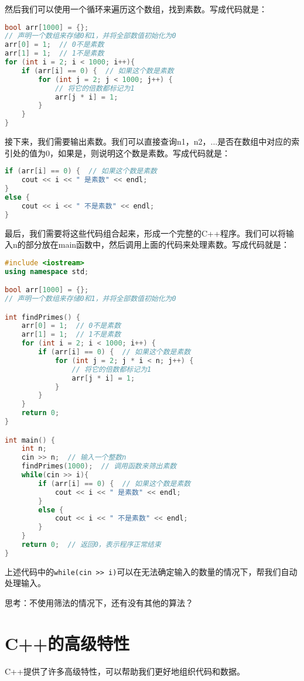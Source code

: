 \documentclass[../main.tex]{subfiles}
\begin{document}
然后我们可以使用一个循环来遍历这个数组，找到素数。写成代码就是：
\begin{lstlisting}[language=C++]
bool arr[1000] = {};
// 声明一个数组来存储0和1，并将全部数值初始化为0
arr[0] = 1;  // 0不是素数
arr[1] = 1;  // 1不是素数
for (int i = 2; i < 1000; i++){
    if (arr[i] == 0) {  // 如果这个数是素数
        for (int j = 2; j < 1000; j++) {
            // 将它的倍数都标记为1
            arr[j * i] = 1;
        }
    }
}
\end{lstlisting}

接下来，我们需要输出素数。我们可以直接查询n1，n2，...是否在数组中对应的索引处的值为0，如果是，则说明这个数是素数。写成代码就是：
\begin{lstlisting}[language=C++]
if (arr[i] == 0) {  // 如果这个数是素数
    cout << i << " 是素数" << endl;
}
else {
    cout << i << " 不是素数" << endl;
}
\end{lstlisting}
最后，我们需要将这些代码组合起来，形成一个完整的C++程序。我们可以将输入n的部分放在main函数中，然后调用上面的代码来处理素数。写成代码就是：
\begin{lstlisting}[language=C++]
#include <iostream>
using namespace std;

bool arr[1000] = {};
// 声明一个数组来存储0和1，并将全部数值初始化为0

int findPrimes() {
    arr[0] = 1;  // 0不是素数
    arr[1] = 1;  // 1不是素数
    for (int i = 2; i < 1000; i++) {
        if (arr[i] == 0) {  // 如果这个数是素数
            for (int j = 2; j * i < n; j++) {
                // 将它的倍数都标记为1
                arr[j * i] = 1;
            }
        }
    }
    return 0;
}

int main() {
    int n;
    cin >> n;  // 输入一个整数n
    findPrimes(1000);  // 调用函数来筛出素数
    while(cin >> i){
        if (arr[i] == 0) {  // 如果这个数是素数
            cout << i << " 是素数" << endl;
        }
        else {
            cout << i << " 不是素数" << endl;
        }
    }
    return 0;  // 返回0，表示程序正常结束
}
\end{lstlisting}
上述代码中的\texttt{while(cin >> i)}可以在无法确定输入的数量的情况下，帮我们自动处理输入。

思考：不使用筛法的情况下，还有没有其他的算法？

\section{C++的高级特性}
C++提供了许多高级特性，可以帮助我们更好地组织代码和数据。
\end{document}
